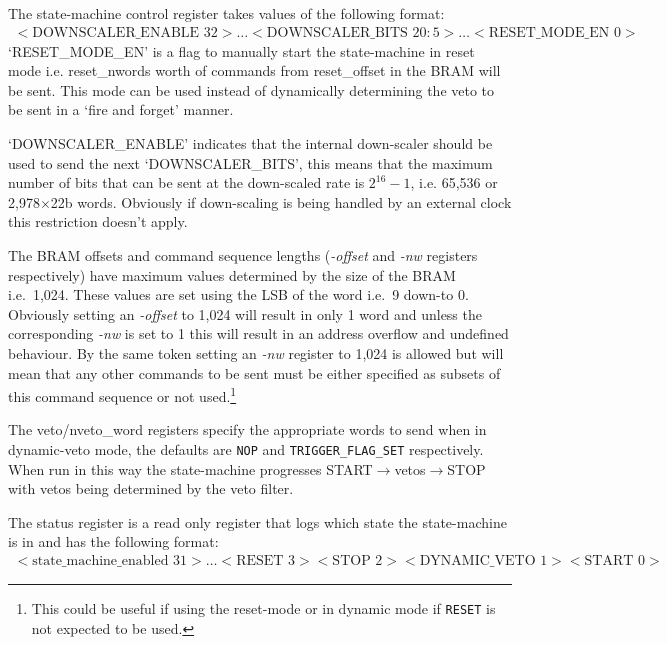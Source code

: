 The state-machine control register takes values of the following format:
\begin{align} \label{fmt:control_reg}
  <\text{DOWNSCALER\_ENABLE } 32>\ldots<\text{DOWNSCALER\_BITS } 20:5>\ldots<\text{RESET\_MODE\_EN } 0>
\end{align}
`RESET\_MODE\_EN' is a flag to manually start the state-machine in reset mode i.e. reset\_nwords worth of commands from reset\_offset in the BRAM will be sent. This mode can be used instead of dynamically determining the veto to be sent in a `fire and forget' manner.

`DOWNSCALER\_ENABLE' indicates that the internal down-scaler should be used to send the next `DOWNSCALER\_BITS', this means that the maximum number of bits that can be sent at the down-scaled rate is \(2^{16} - 1\), i.e. 65,536 or 2,978\(\times\)22b words. Obviously if down-scaling is being handled by an external clock this restriction doesn't apply.

The BRAM offsets and command sequence lengths (\emph{-offset} and \emph{-nw} registers respectively) have maximum values determined by the size of the BRAM i.e.\ 1,024. These values are set using the LSB of the word i.e.\ 9 down-to 0. Obviously setting an \emph{-offset} to 1,024 will result in only 1 word and unless the corresponding \emph{-nw} is set to 1 this will result in an address overflow and undefined behaviour. By the same token setting an \emph{-nw} register to 1,024 is allowed but will mean that any other commands to be sent must be either specified as subsets of this command sequence or not used.\footnote{This could be useful if using the reset-mode or in dynamic mode if \texttt{RESET} is not expected to be used.}
    
The veto/nveto\_word registers specify the appropriate words to send when in dynamic-veto mode, the defaults are \texttt{NOP} and \texttt{TRIGGER\_FLAG\_SET} respectively. When run in this way the state-machine progresses START\(\rightarrow\)vetos\(\rightarrow\)STOP with vetos being determined by the veto filter.
      
The status register is a read only register that logs which state the state-machine is in and has the following format:
\begin{align} \label{fmt:status_reg}
  <\text{state\_machine\_enabled } 31>\ldots<\text{RESET } 3> <\text{STOP } 2> <\text{DYNAMIC\_VETO } 1> <\text{START } 0>
\end{align}
	  
